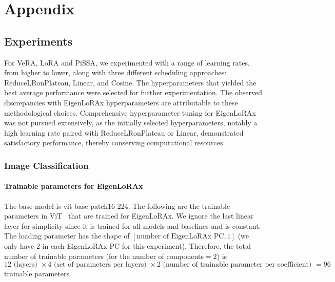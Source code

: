 \section{Appendix}\label{sec:appendix}

\subsection{Experiments}\label{appendix:hyperparameters}
For VeRA, LoRA and PiSSA, we experimented with a range of learning rates, from higher to lower, along with three different scheduling approaches: ReduceLRonPlateau, Linear, and Cosine. The hyperparameters that yielded the best average performance were selected for further experimentation. The observed discrepancies with EigenLoRAx hyperparameters are attributable to these methodological choices. Comprehensive hyperparameter tuning for EigenLoRAx was not pursued extensively, as the initially selected hyperparameters, notably a high learning rate paired with ReduceLRonPlateau or Linear, demonstrated satisfactory performance, thereby conserving computational resources.

\subsubsection{Image Classification}
\paragraph{Trainable parameters for EigenLoRAx}
The base model is vit-base-patch16-224. The following are the trainable parameters in ViT~\citep{vision_transformer} that are trained for EigenLoRAx. We ignore the last linear layer for simplicity since it is trained for all models and baselines and is constant. The loading parameter has the shape of $[\text{number of EigenLoRAx PC} , 1]$ (we only have $2$ in each EigenLoRAx PC for this experiment). Therefore, the total number of trainable parameters (for the number of components$=2$) is $12\text{ (layers) }\times4\text{ (set of parameters per layers) }\times2\text{ (number of trainable parameter per coefficient) } = 96$ trainable parameters.

